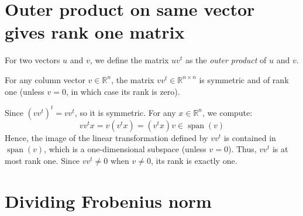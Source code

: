 \section{Outer product on same vector gives rank one matrix} \label{appendix: outer product}

\begin{definition}
  For two vectors \( u \) and \( v \), we define the matrix \( uv^t \) as the \textit{outer product} of \( u \) and \( v \).
\end{definition}

\begin{claim}
  For any column vector \( v \in \mathbb{R}^n \), the matrix \( vv^t \in \mathbb{R}^{n \times n} \) is symmetric and of rank one (unless \( v = 0 \), in which case its rank is zero).
\end{claim}

\begin{explanation}
  Since \(\left( v v^t \right)^t = v v^t \), so it is symmetric. 
  For any \( x \in \mathbb{R}^n \), we compute:
  \[
    vv^t x = v(v^t x) = (v^t x) v \in \operatorname{span}(v)
  \]
  Hence, the image of the linear transformation defined by \( vv^t \) is contained in \( \operatorname{span}(v) \), which is a one-dimensional subspace (unless \( v = 0 \)). Thus, \( vv^t \) is at most rank one. Since \( vv^t \neq 0 \) when \( v \neq 0 \), its rank is exactly one.
\end{explanation}


\section{Dividing Frobenius norm} \label{appendix: divind Frobenius norm}

